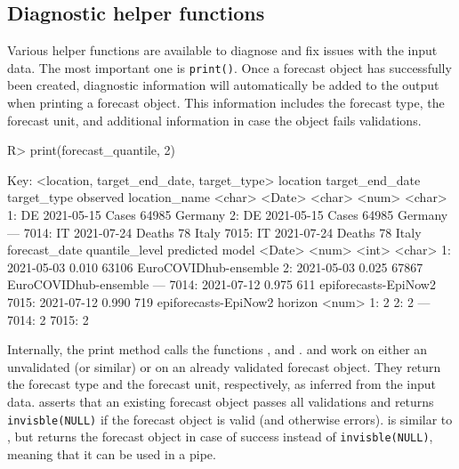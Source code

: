 \documentclass[
]{jss}
\begin{document}
\subsection{Diagnostic helper
functions}\label{diagnostic-helper-functions}

Various helper functions are available to diagnose and fix issues with
the input data. The most important one is \texttt{print()}. Once a
forecast object has successfully been created, diagnostic information
will automatically be added to the output when printing a forecast
object. This information includes the forecast type, the forecast unit,
and additional information in case the object fails validations.

\begin{CodeChunk}
\begin{CodeInput}
R> print(forecast_quantile, 2)
\end{CodeInput}
\begin{CodeOutput}

Key: <location, target_end_date, target_type>
      location target_end_date target_type observed location_name
        <char>          <Date>      <char>    <num>        <char>
   1:       DE      2021-05-15       Cases    64985       Germany
   2:       DE      2021-05-15       Cases    64985       Germany
  ---                                                            
7014:       IT      2021-07-24      Deaths       78         Italy
7015:       IT      2021-07-24      Deaths       78         Italy
      forecast_date quantile_level predicted                 model
             <Date>          <num>     <int>                <char>
   1:    2021-05-03          0.010     63106 EuroCOVIDhub-ensemble
   2:    2021-05-03          0.025     67867 EuroCOVIDhub-ensemble
  ---                                                             
7014:    2021-07-12          0.975       611  epiforecasts-EpiNow2
7015:    2021-07-12          0.990       719  epiforecasts-EpiNow2
      horizon
        <num>
   1:       2
   2:       2
  ---        
7014:       2
7015:       2
\end{CodeOutput}
\end{CodeChunk}

Internally, the print method calls the functions
,  and
.  and
 work on either an unvalidated
 (or similar) or on an already validated forecast
object. They return the forecast type and the forecast unit,
respectively, as inferred from the input data. 
asserts that an existing forecast object passes all validations and
returns \texttt{invisble(NULL)} if the forecast object is valid (and
otherwise errors).  is similar to
, but returns the forecast object in case of
success instead of \texttt{invisble(NULL)}, meaning that it can be used
in a pipe.
\end{document}
